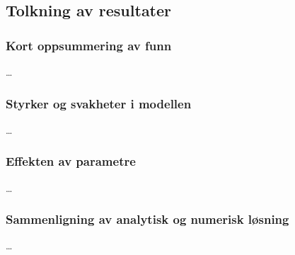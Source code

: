 \subsection{Tolkning av resultater}
\subsubsection{Kort oppsummering av funn}
\dots

\subsubsection{Styrker og svakheter i modellen}
\dots

\subsubsection{Effekten av parametre}
\dots

\subsubsection{Sammenligning av analytisk og numerisk løsning}
\dots